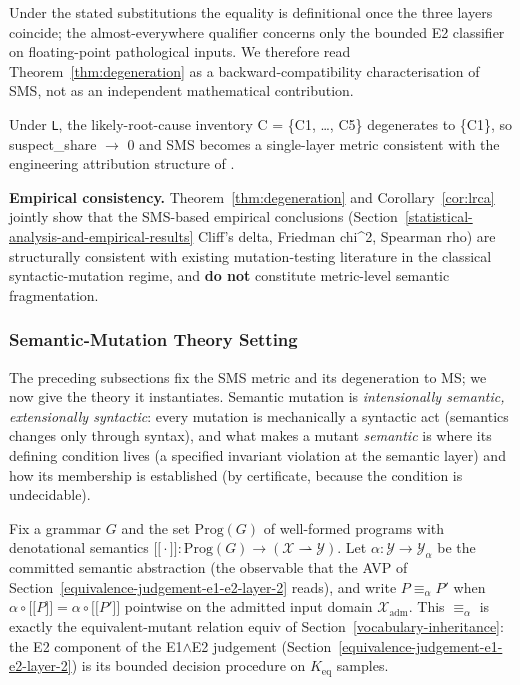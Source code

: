\documentclass[manuscript,screen,review]{acmart}
\begin{document}
Under the stated substitutions the equality is definitional once the
three layers coincide; the almost-everywhere qualifier concerns only
the bounded E2 classifier on floating-point pathological inputs. We
therefore read Theorem~\ref{thm:degeneration} as a
backward-compatibility characterisation of SMS, not as an independent
mathematical contribution.

\begin{corollary}\label{cor:lrca}
Under \texttt{L}, the
likely-root-cause inventory C = \{C1, \ldots, C5\} degenerates to
\{C1\}, so suspect\_share $\to$ 0 and SMS becomes a single-layer metric
consistent with the engineering attribution structure of
\citet{jia2011analysis}.
\end{corollary}

\textbf{Empirical consistency.} Theorem~\ref{thm:degeneration} and
Corollary~\ref{cor:lrca} jointly
show that the SMS-based empirical conclusions (Section~\ref{statistical-analysis-and-empirical-results} Cliff's delta,
Friedman chi\^{}2, Spearman rho) are structurally consistent with
existing mutation-testing literature in the classical syntactic-mutation
regime, and \textbf{do not} constitute metric-level semantic
fragmentation.


\subsubsection{Semantic-Mutation Theory Setting}\label{theory-setting}

The preceding subsections fix the SMS metric and its degeneration to MS; we now
give the theory it instantiates. Semantic mutation is \emph{intensionally
semantic, extensionally syntactic}: every mutation is mechanically a syntactic
act (semantics changes only through syntax), and what makes a mutant
\emph{semantic} is where its defining condition lives (a specified invariant
violation at the semantic layer) and how its membership is established (by
certificate, because the condition is undecidable).

Fix a grammar $G$ and the set $\mathrm{Prog}(G)$ of well-formed programs
with denotational semantics
$\mathopen{\lbrack\!\lbrack}\cdot\mathclose{\rbrack\!\rbrack} : \mathrm{Prog}(G) \to (\mathcal{X} \rightharpoonup \mathcal{Y})$.
Let $\alpha : \mathcal{Y} \to \mathcal{Y}_\alpha$ be the committed
semantic abstraction (the observable that the AVP of Section~\ref{equivalence-judgement-e1-e2-layer-2} reads), and
write $P \equiv_\alpha P'$ when
$\alpha \circ \mathopen{\lbrack\!\lbrack} P \mathclose{\rbrack\!\rbrack} = \alpha \circ \mathopen{\lbrack\!\lbrack} P' \mathclose{\rbrack\!\rbrack}$
pointwise on the admitted input domain $\mathcal{X}_{\mathrm{adm}}$.
This $\equiv_\alpha$ is exactly the equivalent-mutant relation
$\mathrm{equiv}$ of Section~\ref{vocabulary-inheritance}: the E2 component of the E1$\wedge$E2 judgement
(Section~\ref{equivalence-judgement-e1-e2-layer-2}) is its bounded decision procedure on $K_{\mathrm{eq}}$ samples.
\end{document}
